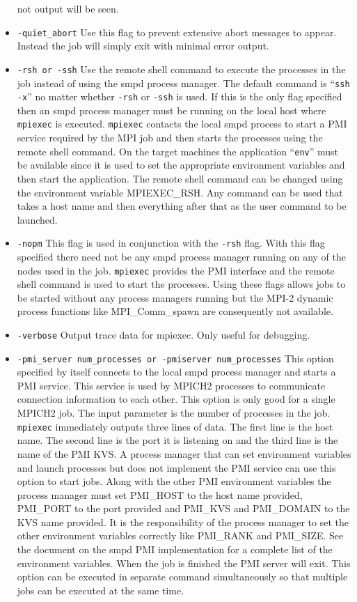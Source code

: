 \documentclass[dvipdfm,11pt]{article}
\begin{document}
\begin{itemize}
not output will be seen.
\item \texttt{-quiet\_abort}
Use this flag to prevent extensive abort messages to appear.  Instead the job 
will simply exit with minimal error output.
\item \texttt{-rsh or -ssh}
Use the remote shell command to execute the processes in the job instead of
using the smpd process manager.  The default command is ``\texttt{ssh -x}'' no
matter whether \texttt{-rsh} or \texttt{-ssh} is used.  If this is the only
flag specified then an smpd process manager must be running on the local host
where \texttt{mpiexec} is executed.  \texttt{mpiexec} contacts the local smpd process to start
a PMI service required by the MPI job and then starts the processes using the 
remote shell command.  On the target machines the application ``\texttt{env}''
must be available since it is used to set the appropriate environment variables
and then start the application.  The remote shell command can be changed using
the environment variable MPIEXEC\_RSH.  Any command can be used that takes a 
host name and then everything after that as the user command to be launched.
\item \texttt{-nopm}
This flag is used in conjunction with the \texttt{-rsh} flag.  With this flag
specified there need not be any smpd process manager running on any of the nodes
used in the job.  \texttt{mpiexec} provides the PMI interface and the remote
shell command is used to start the processes.  Using these flags allows jobs to
be started without any process managers running but the MPI-2 dynamic process
functions like MPI\_Comm\_spawn are consequently not available.
\item \texttt{-verbose}
Output trace data for mpiexec.  Only useful for debugging.
\item \texttt{-pmi\_server num\_processes or -pmiserver num\_processes}
This option specified by itself connects to the local smpd process manager and
starts a PMI service.  This service is used by MPICH2 processes to communicate
connection information to each other.  This option is only good for a single
MPICH2 job.  The input parameter is the number of processes in the job.
\texttt{mpiexec} immediately outputs three lines of data.  The first line is the
host name.  The second line is the port it is listening on and the third line
is the name of the PMI KVS.  A process manager that can set environment variables
and launch processes but does not implement the PMI service can use this option
to start jobs.  Along with the other PMI environment variables the process 
manager must set PMI\_HOST to the host name provided, PMI\_PORT to the port
provided and PMI\_KVS and PMI\_DOMAIN to the KVS name provided.  It is the 
responsibility of the process manager to set the other environment variables
correctly like PMI\_RANK and PMI\_SIZE.  See the document on the smpd PMI implementation
for a complete list of the environment variables.  When the job is finished the
PMI server will exit.  This option can be executed in separate command simultaneously
so that multiple jobs can be executed at the same time.
\end{itemize}
\end{document}

